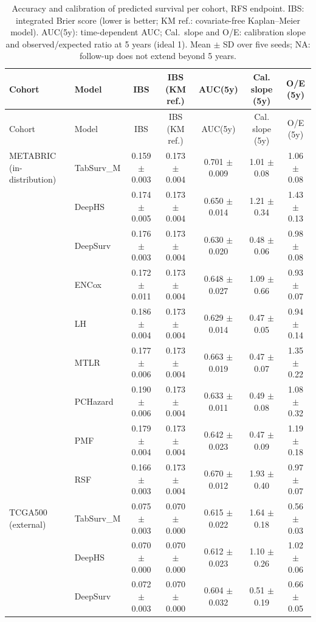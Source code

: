 \begin{longtable}{llccccc}
\caption{Accuracy and calibration of predicted survival per cohort, RFS endpoint. IBS: integrated Brier score (lower is better; KM ref.: covariate-free Kaplan--Meier model). AUC(5y): time-dependent AUC; Cal.\ slope and O/E: calibration slope and observed/expected ratio at 5 years (ideal 1). Mean $\pm$ SD over five seeds; NA: follow-up does not extend beyond 5 years.}
\label{tab:supp_calibration_rfs} \\
\toprule
Cohort & Model & IBS & IBS (KM ref.) & AUC(5y) & Cal. slope (5y) & O/E (5y) \\
\midrule
\endfirsthead
\toprule
Cohort & Model & IBS & IBS (KM ref.) & AUC(5y) & Cal. slope (5y) & O/E (5y) \\
\midrule
\endhead
METABRIC (in-distribution) & TabSurv\_M & 0.159 $\pm$ 0.003 & 0.173 $\pm$ 0.004 & 0.701 $\pm$ 0.009 & 1.01 $\pm$ 0.08 & 1.06 $\pm$ 0.08 \\
 & DeepHS & 0.174 $\pm$ 0.005 & 0.173 $\pm$ 0.004 & 0.650 $\pm$ 0.014 & 1.21 $\pm$ 0.34 & 1.43 $\pm$ 0.13 \\
 & DeepSurv & 0.176 $\pm$ 0.003 & 0.173 $\pm$ 0.004 & 0.630 $\pm$ 0.020 & 0.48 $\pm$ 0.06 & 0.98 $\pm$ 0.08 \\
 & ENCox & 0.172 $\pm$ 0.011 & 0.173 $\pm$ 0.004 & 0.648 $\pm$ 0.027 & 1.09 $\pm$ 0.66 & 0.93 $\pm$ 0.07 \\
 & LH & 0.186 $\pm$ 0.004 & 0.173 $\pm$ 0.004 & 0.629 $\pm$ 0.014 & 0.47 $\pm$ 0.05 & 0.94 $\pm$ 0.14 \\
 & MTLR & 0.177 $\pm$ 0.006 & 0.173 $\pm$ 0.004 & 0.663 $\pm$ 0.019 & 0.47 $\pm$ 0.07 & 1.35 $\pm$ 0.22 \\
 & PCHazard & 0.190 $\pm$ 0.006 & 0.173 $\pm$ 0.004 & 0.633 $\pm$ 0.011 & 0.49 $\pm$ 0.08 & 1.08 $\pm$ 0.32 \\
 & PMF & 0.179 $\pm$ 0.004 & 0.173 $\pm$ 0.004 & 0.642 $\pm$ 0.023 & 0.47 $\pm$ 0.09 & 1.19 $\pm$ 0.18 \\
 & RSF & 0.166 $\pm$ 0.003 & 0.173 $\pm$ 0.004 & 0.670 $\pm$ 0.012 & 1.93 $\pm$ 0.40 & 0.97 $\pm$ 0.07 \\
\midrule
TCGA500 (external) & TabSurv\_M & 0.075 $\pm$ 0.003 & 0.070 $\pm$ 0.000 & 0.615 $\pm$ 0.022 & 1.64 $\pm$ 0.18 & 0.56 $\pm$ 0.03 \\
 & DeepHS & 0.070 $\pm$ 0.000 & 0.070 $\pm$ 0.000 & 0.612 $\pm$ 0.023 & 1.10 $\pm$ 0.26 & 1.02 $\pm$ 0.06 \\
 & DeepSurv & 0.072 $\pm$ 0.003 & 0.070 $\pm$ 0.000 & 0.604 $\pm$ 0.032 & 0.51 $\pm$ 0.19 & 0.66 $\pm$ 0.05 \\

\end{longtable}
